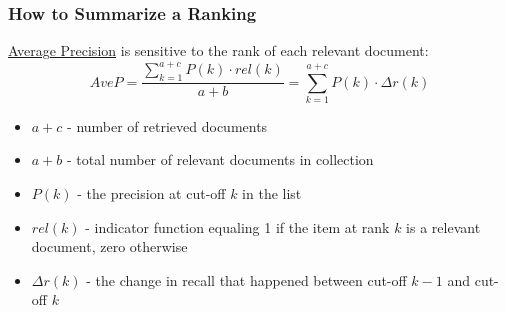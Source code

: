 

\subsubsection{How to Summarize a Ranking}
\href{http://en.wikipedia.org/wiki/Information_retrieval#Average_precision}{Average Precision} is sensitive to the rank of each relevant document:
\begin{equation*}
AveP = \dfrac{\sum\limits_{k=1}^{a+c} P(k) \cdot rel(k)}{a+b} = \sum\limits_{k=1}^{a+c} P(k) \cdot \Delta r(k)
\end{equation*}
\begin{itemize}
\item $a+c$ - number of retrieved documents
\item $a+b$ - total number of relevant documents in collection
\item $P(k)$ - the precision at cut-off $k$ in the list
\item $rel(k)$ - indicator function equaling 1 if the item at rank $k$ is a relevant document, zero otherwise
\item $\Delta r(k)$ - the change in recall that happened between cut-off $k-1$ and cut-off $k$
\end{itemize}

